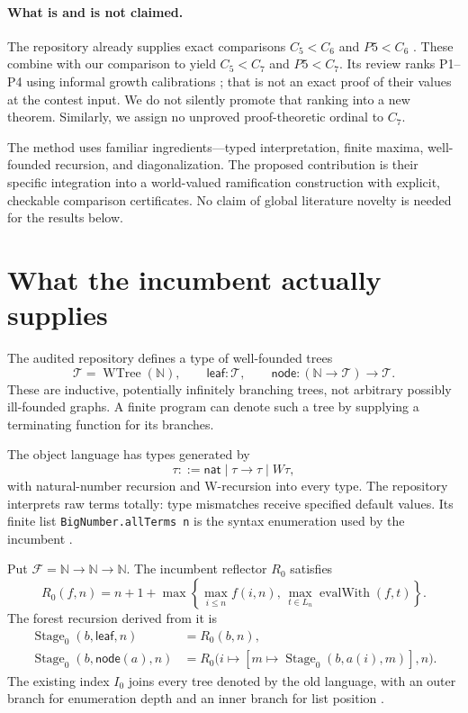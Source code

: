 \documentclass[11pt]{article}
\theoremstyle{definition}
\theoremstyle{remark}
\newcommand{\N}{\mathbb N}
\newcommand{\Tree}{\mathcal T}
\newcommand{\Fam}{\mathcal F}
\newcommand{\OldStage}{\operatorname{Stage}_0}
\newcommand{\code}[1]{\texttt{#1}}
\begin{document}
\paragraph{What is and is not claimed.}
The repository already supplies exact comparisons $C_5<C_6$ and $P5<C_6$
\cite{comparison}. These combine with our comparison to yield $C_5<C_7$ and
$P5<C_7$. Its review ranks P1--P4 using informal growth calibrations
\cite{review}; that is not an exact proof of their values at the contest
input. We do not silently promote that ranking into a new theorem.
Similarly, we assign no unproved proof-theoretic ordinal to $C_7$.

The method uses familiar ingredients---typed interpretation, finite maxima,
well-founded recursion, and diagonalization. The proposed contribution is
their specific integration into a world-valued ramification construction
with explicit, checkable comparison certificates. No claim of global
literature novelty is needed for the results below.

\section{What the incumbent actually supplies}\label{sec:incumbent}

The audited repository defines a type of well-founded trees
\[
 \Tree=\operatorname{WTree}(\N),\qquad
 \mathsf{leaf}:\Tree,\qquad
 \mathsf{node}:(\N\to\Tree)\to\Tree.
\]
These are inductive, potentially infinitely branching trees, not arbitrary
possibly ill-founded graphs. A finite program can denote such a tree by
supplying a terminating function for its branches.

The object language has types generated by
\[
 \tau ::= \mathsf{nat}\mid\tau\to\tau\mid W\tau,
\]
with natural-number recursion and W-recursion into every type. The repository
interprets raw terms totally: type mismatches receive specified default
values. Its finite list \code{BigNumber.allTerms n} is the syntax enumeration
used by the incumbent \cite{definitions}.

Put $\Fam=\N\to\N\to\N$. The incumbent reflector $R_0$ satisfies
\[
 R_0(f,n)=n+1+
 \max\left\{\max_{i\le n} f(i,n),\,
             \max_{t\in L_n}\operatorname{evalWith}(f,t)\right\}.
\]
The forest recursion derived from it is
\begin{align*}
 \OldStage(b,\mathsf{leaf},n)&=R_0(b,n),\\
 \OldStage(b,\mathsf{node}(a),n)&=
 R_0\bigl(i\mapsto[m\mapsto\OldStage(b,a(i),m)],n\bigr).
\end{align*}
The existing index $I_0$ joins every tree denoted by the old language,
with an outer branch for enumeration depth and an inner branch for list
position \cite{contender6,reflection}.
\end{document}
